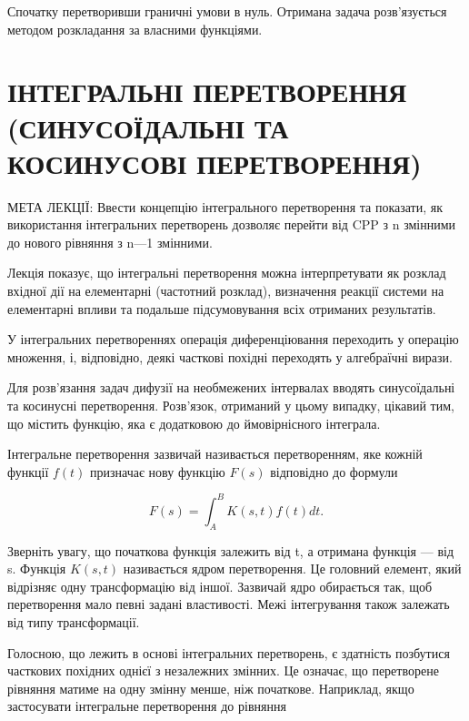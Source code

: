 \documentclass[
  ukrainian,
]{article}
\begin{document}
Спочатку перетворивши граничні умови в нуль. Отримана задача
розв'язується методом розкладання за власними функціями.

\section{ІНТЕГРАЛЬНІ ПЕРЕТВОРЕННЯ (СИНУСОЇДАЛЬНІ ТА КОСИНУСОВІ
ПЕРЕТВОРЕННЯ)}\label{ux456ux43dux442ux435ux433ux440ux430ux43bux44cux43dux456-ux43fux435ux440ux435ux442ux432ux43eux440ux435ux43dux43dux44f-ux441ux438ux43dux443ux441ux43eux457ux434ux430ux43bux44cux43dux456-ux442ux430-ux43aux43eux441ux438ux43dux443ux441ux43eux432ux456-ux43fux435ux440ux435ux442ux432ux43eux440ux435ux43dux43dux44f}

МЕТА ЛЕКЦІЇ: Ввести концепцію інтегрального перетворення та показати, як
використання інтегральних перетворень дозволяє перейти від CPP з n
змінними до нового рівняння з n---1 змінними.

Лекція показує, що інтегральні перетворення можна інтерпретувати як
розклад вхідної дії на елементарні (частотний розклад), визначення
реакції системи на елементарні впливи та подальше підсумовування всіх
отриманих результатів.

У інтегральних перетвореннях операція диференціювання переходить у
операцію множення, і, відповідно, деякі часткові похідні переходять у
алгебраїчні вирази.

Для розв'язання задач дифузії на необмежених інтервалах вводять
синусоїдальні та косинусні перетворення. Розв'язок, отриманий у цьому
випадку, цікавий тим, що містить функцію, яка є додатковою до
ймовірнісного інтеграла.

Інтегральне перетворення зазвичай називається перетворенням, яке кожній
функції \(f(t)\) призначає нову функцію \(F(s)\) відповідно до формули

\[
F(s) = \int_{A}^{B} K(s, t) f(t) dt.
\]

Зверніть увагу, що початкова функція залежить від t, а отримана функція
--- від s. Функція \(K(s,t)\) називається ядром перетворення. Це
головний елемент, який відрізняє одну трансформацію від іншої. Зазвичай
ядро обирається так, щоб перетворення мало певні задані властивості.
Межі інтегрування також залежать від типу трансформації.

Голосною, що лежить в основі інтегральних перетворень, є здатність
позбутися часткових похідних однієї з незалежних змінних. Це означає, що
перетворене рівняння матиме на одну змінну менше, ніж початкове.
Наприклад, якщо застосувати інтегральне перетворення до рівняння
\end{document}
